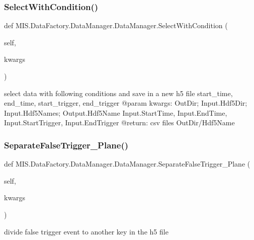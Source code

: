 \subsubsection{\texorpdfstring{Select\+With\+Condition()}{SelectWithCondition()}}
{\footnotesize\ttfamily def M\+I\+S.\+Data\+Factory.\+Data\+Manager.\+Data\+Manager.\+Select\+With\+Condition (\begin{DoxyParamCaption}\item[{}]{self,  }\item[{}]{kwargs }\end{DoxyParamCaption})}

\begin{DoxyVerb}select data with following conditions and save in a new h5 file
    start_time, end_time, start_trigger, end_trigger
@param kwargs: OutDir; Input.Hdf5Dir; Input.Hdf5Names; Output.Hdf5Name
    Input.StartTime, Input.EndTime, Input.StartTrigger, Input.EndTrigger
@return: csv files
    OutDir/Hdf5Name
\end{DoxyVerb}
 \mbox{\label{classMIS_1_1DataFactory_1_1DataManager_1_1DataManager_a3e82281475c60ff354baa6388ddc2f61}} 
\subsubsection{\texorpdfstring{Separate\+False\+Trigger\+\_\+\+Plane()}{SeparateFalseTrigger\_Plane()}}
{\footnotesize\ttfamily def M\+I\+S.\+Data\+Factory.\+Data\+Manager.\+Data\+Manager.\+Separate\+False\+Trigger\+\_\+\+Plane (\begin{DoxyParamCaption}\item[{}]{self,  }\item[{}]{kwargs }\end{DoxyParamCaption})}

\begin{DoxyVerb}divide false trigger event to another key in the h5 file\end{DoxyVerb}
 \mbox{\label{classMIS_1_1DataFactory_1_1DataManager_1_1DataManager_a1953691edc57314c60854a0cccaeb756}} 
